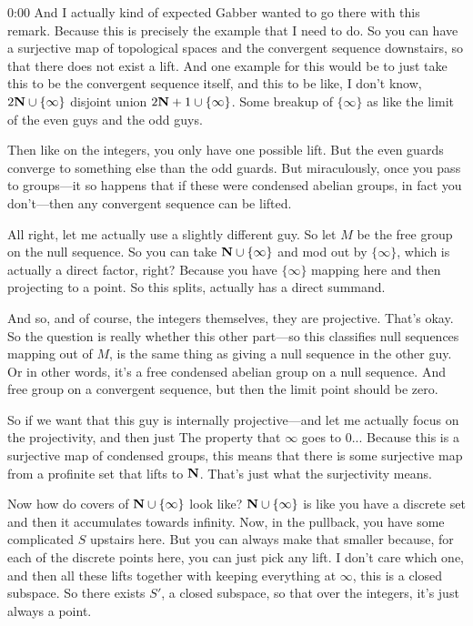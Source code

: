 \begin{unfinished}{0:00}
And I actually kind of expected Gabber wanted to go there with this remark. Because this is precisely the example that I need to do. So you can have a surjective map of topological spaces and the convergent sequence downstairs, so that there does not exist a lift. And one example for this would be to just take this to be the convergent sequence itself, and this to be like, I don't know, $2\mathbf N \cup \{\infty\}$ disjoint union $2\mathbf N+1 \cup \{\infty\}$. Some breakup of $\{\infty\}$ as like the limit of the even guys and the odd guys.

Then like on the integers, you only have one possible lift. But the even guards converge to something else than the odd guards. But miraculously, once you pass to groups---it so happens that if these were condensed abelian groups, in fact you don't---then any convergent sequence can be lifted.

All right, let me actually use a slightly different guy. So let $M$ be the free group on the null sequence. So you can take $\mathbf N \cup \{\infty\}$ and mod out by $\{\infty\}$, which is actually a direct factor, right? Because you have $\{\infty\}$ mapping here and then projecting to a point. So this splits, actually has a direct summand.

And so, and of course, the integers themselves, they are projective. That's okay. So the question is really whether this other part---so this classifies null sequences mapping out of $M$, is the same thing as giving a null sequence in the other guy. Or in other words, it's a free condensed abelian group on a null sequence. And free group on a convergent sequence, but then the limit point should be zero.

So if we want that this guy is internally projective---and let me actually focus on the projectivity, and then just
The property that $\infty$ goes to $0$... Because this is a surjective map of condensed groups, this means that there is some surjective map from a profinite set that lifts to $\mathbf N$. That's just what the surjectivity means.

Now how do covers of $\mathbf N \cup \{\infty\}$ look like? $\mathbf N \cup \{\infty\}$ is like you have a discrete set and then it accumulates towards infinity. Now, in the pullback, you have some complicated $S$ upstairs here. But you can always make that smaller because, for each of the discrete points here, you can just pick any lift. I don't care which one, and then all these lifts together with keeping everything at $\infty$, this is a closed subspace. So there exists $S'$, a closed subspace, so that over the integers, it's just always a point.


\end{unfinished}
